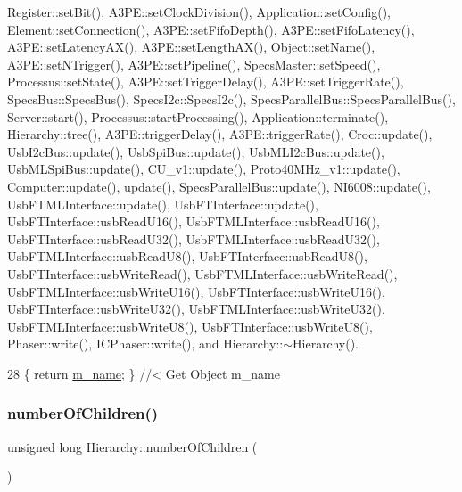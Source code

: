 Register\+::set\+Bit(), A3\+P\+E\+::set\+Clock\+Division(), Application\+::set\+Config(), Element\+::set\+Connection(), A3\+P\+E\+::set\+Fifo\+Depth(), A3\+P\+E\+::set\+Fifo\+Latency(), A3\+P\+E\+::set\+Latency\+A\+X(), A3\+P\+E\+::set\+Length\+A\+X(), Object\+::set\+Name(), A3\+P\+E\+::set\+N\+Trigger(), A3\+P\+E\+::set\+Pipeline(), Specs\+Master\+::set\+Speed(), Processus\+::set\+State(), A3\+P\+E\+::set\+Trigger\+Delay(), A3\+P\+E\+::set\+Trigger\+Rate(), Specs\+Bus\+::\+Specs\+Bus(), Specs\+I2c\+::\+Specs\+I2c(), Specs\+Parallel\+Bus\+::\+Specs\+Parallel\+Bus(), Server\+::start(), Processus\+::start\+Processing(), Application\+::terminate(), Hierarchy\+::tree(), A3\+P\+E\+::trigger\+Delay(), A3\+P\+E\+::trigger\+Rate(), Croc\+::update(), Usb\+I2c\+Bus\+::update(), Usb\+Spi\+Bus\+::update(), Usb\+M\+L\+I2c\+Bus\+::update(), Usb\+M\+L\+Spi\+Bus\+::update(), C\+U\+\_\+v1\+::update(), Proto40\+M\+Hz\+\_\+v1\+::update(), Computer\+::update(), update(), Specs\+Parallel\+Bus\+::update(), N\+I6008\+::update(), Usb\+F\+T\+M\+L\+Interface\+::update(), Usb\+F\+T\+Interface\+::update(), Usb\+F\+T\+Interface\+::usb\+Read\+U16(), Usb\+F\+T\+M\+L\+Interface\+::usb\+Read\+U16(), Usb\+F\+T\+Interface\+::usb\+Read\+U32(), Usb\+F\+T\+M\+L\+Interface\+::usb\+Read\+U32(), Usb\+F\+T\+M\+L\+Interface\+::usb\+Read\+U8(), Usb\+F\+T\+Interface\+::usb\+Read\+U8(), Usb\+F\+T\+Interface\+::usb\+Write\+Read(), Usb\+F\+T\+M\+L\+Interface\+::usb\+Write\+Read(), Usb\+F\+T\+M\+L\+Interface\+::usb\+Write\+U16(), Usb\+F\+T\+Interface\+::usb\+Write\+U16(), Usb\+F\+T\+Interface\+::usb\+Write\+U32(), Usb\+F\+T\+M\+L\+Interface\+::usb\+Write\+U32(), Usb\+F\+T\+M\+L\+Interface\+::usb\+Write\+U8(), Usb\+F\+T\+Interface\+::usb\+Write\+U8(), Phaser\+::write(), I\+C\+Phaser\+::write(), and Hierarchy\+::$\sim$\+Hierarchy().


\begin{DoxyCode}
28 \{ \textcolor{keywordflow}{return} \hyperlink{classObject_a8b83c95c705d2c3ba0d081fe1710f48d}{m\_name}; \} \textcolor{comment}{//< Get Object m\_name}
\end{DoxyCode}
\mbox{\label{classHierarchy_ab16e84de65fd84e14001a6cf941c8be4}} 
\subsubsection{\texorpdfstring{number\+Of\+Children()}{numberOfChildren()}}
{\footnotesize\ttfamily unsigned long Hierarchy\+::number\+Of\+Children (\begin{DoxyParamCaption}{ }\end{DoxyParamCaption})\hspace{0.3cm}{\ttfamily [inherited]}}



